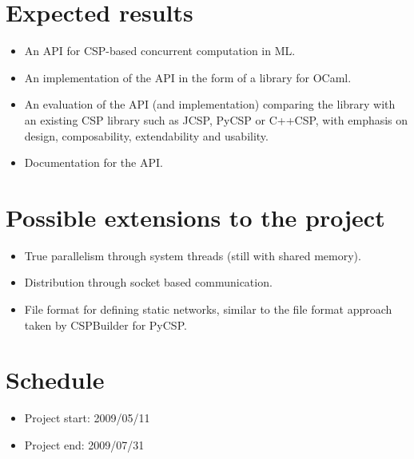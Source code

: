 \documentclass[a4paper,12pt]{article}
\begin{document}
\section*{Expected results}
\begin{itemize}
 \item An API for CSP-based concurrent computation in ML.
 \item An implementation of the API in the form of a library for OCaml.
 \item An evaluation of the API (and implementation) comparing
   the library with an existing CSP library such as JCSP, PyCSP or C++CSP,
   with emphasis on design, composability, extendability and usability.
 \item Documentation for the API.
\end{itemize}

\section*{Possible extensions to the project}
\begin{itemize}
 \item True parallelism through system threads (still with shared memory).
 \item Distribution through socket based communication.
 \item File format for defining static networks, similar to the file format 
   approach taken by CSPBuilder for PyCSP.
\end{itemize}

\section*{Schedule}
\begin{itemize}
 \item Project start: 2009/05/11
 \item Project end: 2009/07/31
\end{itemize}
\end{document}

